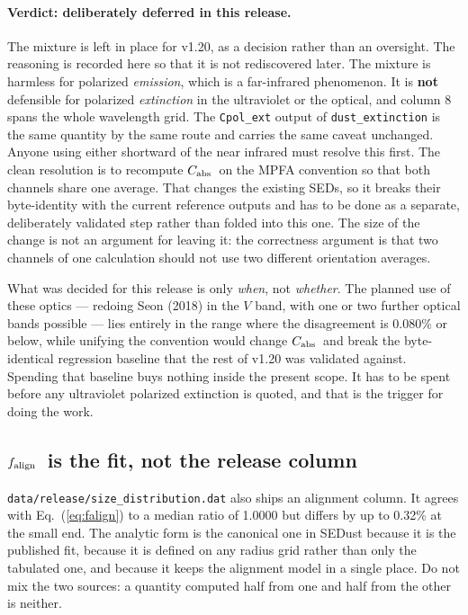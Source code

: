 \documentclass{my_memo}
\newcommand{\code}[1]{\texttt{#1}}
\newcommand{\Cabs}{\ensuremath{C_{\rm abs}}}
\newcommand{\falign}{\ensuremath{f_{\rm align}}}
\begin{document}
\paragraph{Verdict: deliberately deferred in this release.} The mixture is
left in place for v1.20, as a decision rather than an oversight. The reasoning
is recorded here so that it is not rediscovered later. The mixture is harmless
for polarized \emph{emission},
which is a far-infrared phenomenon. It is \textbf{not} defensible for
polarized \emph{extinction} in the ultraviolet or the optical, and column 8
spans the whole wavelength grid. The \code{Cpol\_ext} output of
\code{dust\_extinction} is the same quantity by the same route and carries the
same caveat unchanged. Anyone using either shortward of the near
infrared must resolve this first. The clean resolution is to recompute \Cabs\
on the MPFA convention so that both channels share one average. That changes
the existing SEDs, so it breaks their byte-identity with the current reference
outputs and has to be done as a separate, deliberately validated step rather
than folded into this one. The size of the change is not an argument for
leaving it: the correctness argument is that two channels of one calculation
should not use two different orientation averages.

What was decided for this release is only \emph{when}, not \emph{whether}.
The planned use of these optics --- redoing Seon (2018) in the $V$ band, with
one or two further optical bands possible --- lies entirely in the range where
the disagreement is $0.080\%$ or below, while unifying the convention would
change \Cabs\ and break the byte-identical regression baseline that the rest
of v1.20 was validated against. Spending that baseline buys nothing inside the
present scope. It has to be spent before any ultraviolet polarized extinction
is quoted, and that is the trigger for doing the work.

\subsection{\falign\ is the fit, not the release column}

\code{data/release/size\_distribution.dat} also ships an alignment column. It
agrees with Eq.~(\ref{eq:falign}) to a median ratio of 1.0000 but differs by up
to 0.32\% at the small end. The analytic form is the canonical one in SEDust
because it is the published fit, because it is defined on any radius grid
rather than only the tabulated one, and because it keeps the alignment model in
a single place. Do not mix the two sources: a quantity computed half from one
and half from the other is neither.
\end{document}

